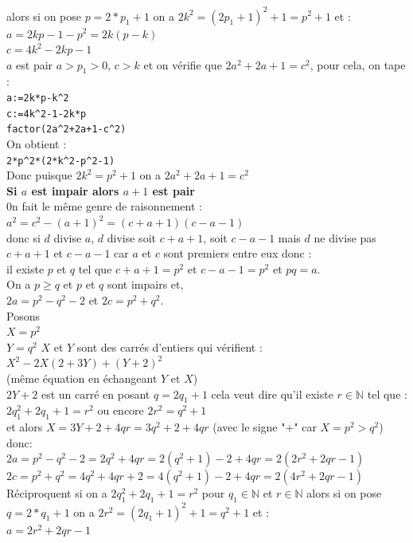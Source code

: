 \documentclass[a4paper,11pt]{book}
\newcommand{\N}{{\mathbb{N}}}
\begin{document}
\begin{enumerate}
alors si on pose $p=2*p_1+1$ on a  $2k^2=(2p_1+1)^2+1=p^2+1$ et :\\
$a=2kp-1-p^2=2k(p-k)$\\
$c=4k^2-2kp-1$\\
$a$ est pair $a>p_1>0$, $c>k$ et on v\'erifie que  $2a^2+2a+1=c^2$, pour cela, 
on tape :\\
{\tt a:=2k*p-k\verb|^|2}\\
{\tt c:=4k\verb|^|2-1-2k*p}\\
{\tt factor(2a\verb|^|2+2a+1-c\verb|^|2)}\\
On obtient :\\
{\tt 2*p\verb|^|2*(2*k\verb|^|2-p\verb|^|2-1)}\\
Donc puisque $2k^2=p^2+1$ on a $2a^2+2a+1=c^2$\\
{\bf Si $a$ est impair alors $a+1$ est pair}\\
0n fait le m\^eme genre de raisonnement :\\
$a^2=c^2-(a+1)^2=(c+a+1)(c-a-1)$\\
donc si $d$ divise $a$, $d$ divise soit $c+a+1$, soit $c-a-1$ mais $d$ ne 
divise pas $c+a+1$ et $c-a-1$ car $a$ et $c$ sont premiers entre eux donc :\\
il existe $p$ et $q$ tel que  $c+a+1=p^2$ et $c-a-1=p^2$ et $pq=a$.\\
On a $p\geq q$ et $p$ et $q$ sont impairs et,\\
$2a=p^2-q^2-2$ et $2c=p^2+q^2$.\\
Posons\\
$X=p^2$\\
$Y=q^2$
$X$ et $Y$ sont des carr\'es d'entiers qui v\'erifient :\\
$X^2-2X(2+3Y)+(Y+2)^2$\\
(m\^eme \'equation en \'echangeant $Y$ et $X$)\\
$2Y+2$ est un carr\'e en posant $q=2q_1+1$ cela veut dire qu'il existe 
$r \in \N$ tel que : $2q_1^2+2q_1+1=r^2$ ou encore $2r^2=q^2+1$\\
et alors $X=3Y+2+4qr=3q^2+2+4qr$ (avec le signe "+" car $X=p^2>q^2$)
donc:\\
$2a=p^2-q^2-2=2q^2+4qr=2(q^2+1)-2+4qr=2(2r^2+2qr-1)$\\
$2c=p^2+q^2=4q^2+4qr+2=4(q^2+1)-2+4qr=2(4r^2+2qr-1)$\\
R\'eciproquent si on a $2q_1^2+2q_1+1=r^2$ pour $q_1 \in \N$ et $r \in \N$
alors si on pose $q=2*q_1+1$ on a  $2r^2=(2q_1+1)^2+1=q^2+1$ et :\\
$a=2r^2+2qr-1$\\

\end{enumerate}
\end{document}
